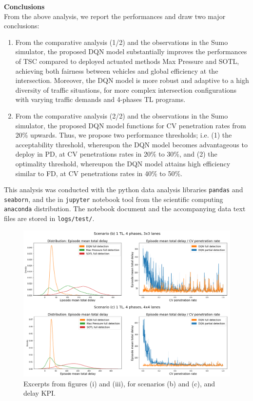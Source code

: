 \textbf{Conclusions} \\
From the above analysis, we report the performances and draw two major conclusions:
\begin{enumerate}
\setlength\itemsep{-0.5em}
  \item From the comparative analysis (1/2) and the observations in the Sumo simulator, the proposed DQN model substantially improves the performances of TSC compared to deployed actuated methods Max Pressure and SOTL, achieving both fairness between vehicles and global efficiency at the intersection. Moreover, the DQN model is more robust and adaptive to a high diversity of traffic situations, for more complex intersection configurations with varying traffic demands and 4-phases TL programs.
  \item From the comparative analysis (2/2) and the observations in the Sumo simulator, the proposed DQN model functions for CV penetration rates from 20\% upwards. Thus, we propose two performance thresholds; i.e. (1) the acceptability threshold, whereupon the DQN model becomes advantageous to deploy in PD, at CV penetrations rates in 20\% to 30\%, and (2) the optimality threshold, whereupon the DQN model attains high efficiency similar to FD, at CV penetrations rates in 40\% to 50\%.
\end{enumerate}

This analysis was conducted with the python data analysis libraries \texttt{pandas} and \texttt{seaborn}, and the in \texttt{jupyter} notebook tool from the scientific computing \texttt{anaconda} distribution. The notebook document and the accompanying data text files are stored in \texttt{logs/test/}.

\begin{figure}[h]
  \includegraphics[width=\textwidth]{img/II/analysis_summary.png}
  \centering
  \captionsetup{justification=centering}
  \caption{Excerpts from figures (i) and (iii), for scenarios (b) and (c), and delay KPI.}
\end{figure}

